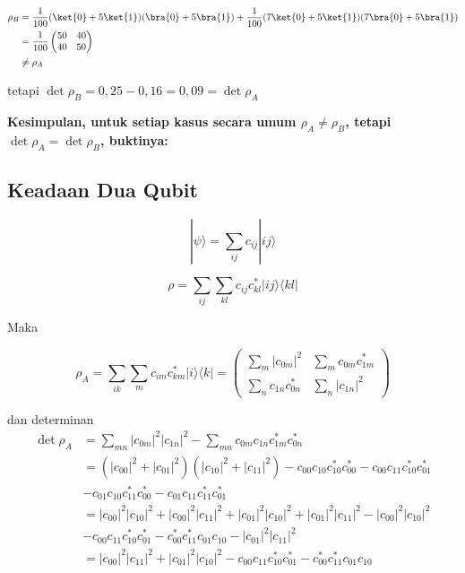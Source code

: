 \begin{enumerate}
	\begin{equation}
		\begin{aligned}
			\rho_B
			&=\frac{1}{100}(\ket{0}+5\ket{1})(\bra{0}+5\bra{1})+\frac{1}{100}(7\ket{0}+5\ket{1})(7\bra{0}+5\bra{1})\\
			&=\frac{1}{100}
			\begin{pmatrix}
				50&40\\
				40&50
			\end{pmatrix}\\
			&\neq\rho_A
		\end{aligned}
	\end{equation}
	
	tetapi $\det\rho_B=0,25-0,16=0,09=\det\rho_A$
\end{enumerate}

\textbf{Kesimpulan, untuk setiap kasus secara umum $\rho_{A}\neq\rho_{B}$, tetapi $\det\rho_A=\det\rho_B$, buktinya:}

\subsection{Keadaan Dua Qubit}
\begin{equation}
	|\psi\rangle = \sum_{i j} c_{i j} | i j \rangle
\end{equation}

\begin{equation}
	\rho = \sum_{i j} \sum_{k l} c_{i j} c^{*}_{k l} | i j \rangle \langle k l |
\end{equation}

Maka

\begin{equation}
	\rho_A
	= \sum_{i k} \sum_{m} c_{i m} c^{*}_{k m} | i \rangle \langle k |
	= \begin{pmatrix}
		\sum_m |c_{0m}|^2 & \sum_m c_{0m} c^{*}_{1m} \\
		\sum_n c_{1n} c^{*}_{0n} & \sum_n |c_{1n}|^2
	\end{pmatrix}
\end{equation}

dan determinan
\begin{equation}
	\begin{aligned}
		\det \rho_A
		&= \sum_{m n} |c_{0m}|^2 |c_{1n}|^2
		- \sum_{m n} c_{0m} c_{1n} c^{*}_{1m} c^{*}_{0n}\\
		&= (|c_{00}|^2 + |c_{01}|^2)(|c_{10}|^2 + |c_{11}|^2) - c_{00} c_{10} c^{*}_{10} c^{*}_{00} - c_{00} c_{11} c^{*}_{10} c^{*}_{01}\\
		&- c_{01} c_{10} c^{*}_{11} c^{*}_{00} - c_{01} c_{11} c^{*}_{11} c^{*}_{01}\\
		&= |c_{00}|^2 |c_{10}|^2
		+ |c_{00}|^2 |c_{11}|^2
		+ |c_{01}|^2 |c_{10}|^2
		+ |c_{01}|^2 |c_{11}|^2- |c_{00}|^2 |c_{10}|^2\\
		&- c_{00} c_{11} c^{*}_{10} c^{*}_{01}
		- c^{*}_{00} c^{*}_{11} c_{01} c_{10}- |c_{01}|^2 |c_{11}|^2\\
		&= |c_{00}|^2 |c_{11}|^2
		+ |c_{01}|^2 |c_{10}|^2
		- c_{00} c_{11} c^{*}_{10} c^{*}_{01}
		- c^{*}_{00} c^{*}_{11} c_{01} c_{10}
	\end{aligned}
\end{equation}

